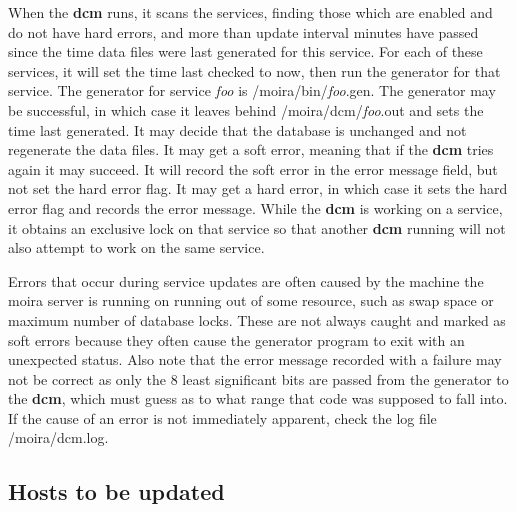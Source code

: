 When the {\bf dcm} runs, it scans the services, finding those which are
enabled and do not have hard errors, and more than update interval
minutes have passed since the time data files were last generated for
this service.  For each of these services, it will set the time last
checked to now, then run the generator for that service.  The
generator for service {\em foo} is /moira/bin/{\em foo}.gen.  The
generator may be successful, in which case it leaves behind
/moira/dcm/{\em foo}.out and sets the time last generated.  It may
decide that the database is unchanged and not regenerate the
data files.  It may get a soft error, meaning that if the {\bf dcm} tries
again it may succeed.  It will record the soft error in the error
message field, but not set the hard error flag.  It may get a hard
error, in which case it sets the hard error flag and records the error
message.  While the {\bf dcm} is working on a service, it obtains an
exclusive lock on that service so that another {\bf dcm} running will
not also attempt to work on the same service.

Errors that occur during service updates are often caused by the
machine the moira server is running on running out of some resource,
such as swap space or maximum number of database locks.  These are not
always caught and marked as soft errors because they often cause the
generator program to exit with an unexpected status.  Also note that
the error message recorded with a failure may not be correct as only
the 8 least significant bits are passed from the generator to the
{\bf dcm}, which must guess as to what range that code was supposed to
fall into.  If the cause of an error is not immediately apparent,
check the log file /moira/dcm.log.

\subsection{Hosts to be updated}


